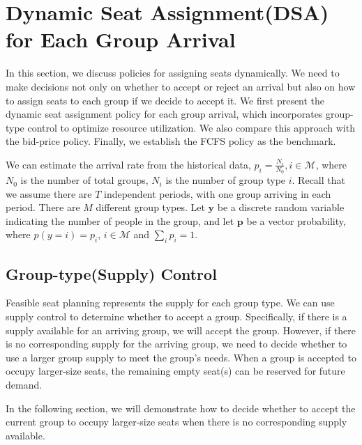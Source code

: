 
\section{Dynamic Seat Assignment(DSA) for Each Group Arrival}
In this section, we discuss policies for assigning seats dynamically. We need to make decisions not only on whether to accept or reject an arrival but also on how to assign seats to each group if we decide to accept it. We first present the dynamic seat assignment policy for each group arrival, which incorporates group-type control to optimize resource utilization. We also compare this approach with the bid-price policy. Finally, we establish the FCFS policy as the benchmark.

We can estimate the arrival rate from the historical data, $p_i = \frac{N_{i}}{N_{0}}, i \in \mathcal{M}$, where $N_{0}$ is the number of total groups, $N_{i}$ is the number of group type $i$. Recall that we assume there are $T$ independent periods, with one group arriving in each period. There are $M$ different group types. Let $\mathbf{y}$ be a discrete random variable indicating the number of people in the group, and let $\mathbf{p}$ be a vector probability, where $p(y = i) = p_i$, $i \in \mathcal{M}$ and $\sum_{i} p_{i} =1$.


\subsection{Group-type(Supply) Control}\label{nested_policy}
Feasible seat planning represents the supply for each group type. We can use supply control to determine whether to accept a group. Specifically, if there is a supply available for an arriving group, we will accept the group. However, if there is no corresponding supply for the arriving group, we need to decide whether to use a larger group supply to meet the group's needs. When a group is accepted to occupy larger-size seats, the remaining empty seat(s) can be reserved for future demand.

In the following section, we will demonstrate how to decide whether to accept the current group to occupy larger-size seats when there is no corresponding supply available.


